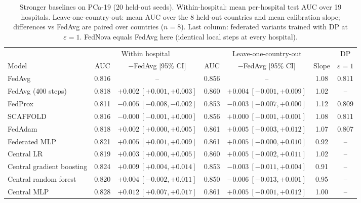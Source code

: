 \begin{table}[t]
\caption{Stronger baselines on PCa-19 (20 held-out seeds). Within-hospital: mean per-hospital test AUC over 19 hospitals. Leave-one-country-out: mean AUC over the 8 held-out countries and mean calibration slope; differences vs FedAvg are paired over countries ($n=8$). Last column: federated variants trained with DP at $\varepsilon=1$. FedNova equals FedAvg here (identical local steps at every hospital).}
\centering\small
\begin{tabular}{lcccccc}
\toprule
& \multicolumn{2}{c}{Within hospital} & \multicolumn{3}{c}{Leave-one-country-out} & DP \\
Model & AUC & $-$FedAvg [95\% CI] & AUC & $-$FedAvg [95\% CI] & Slope & $\varepsilon=1$ \\
\midrule
FedAvg & 0.816 & -- & 0.856 & -- & 1.08 & 0.811 \\
FedAvg (400 steps) & 0.818 & $+0.002\ [+0.001, +0.003]$ & 0.860 & $+0.004\ [\ensuremath{-}0.001, +0.009]$ & 1.02 & -- \\
FedProx & 0.811 & $-0.005\ [\ensuremath{-}0.008, \ensuremath{-}0.002]$ & 0.853 & $-0.003\ [\ensuremath{-}0.007, +0.000]$ & 1.12 & 0.809 \\
SCAFFOLD & 0.816 & $-0.000\ [\ensuremath{-}0.001, +0.000]$ & 0.856 & $+0.000\ [\ensuremath{-}0.001, +0.001]$ & 1.08 & 0.811 \\
FedAdam & 0.818 & $+0.002\ [+0.000, +0.005]$ & 0.861 & $+0.005\ [\ensuremath{-}0.003, +0.012]$ & 1.07 & 0.807 \\
Federated MLP & 0.821 & $+0.005\ [+0.001, +0.009]$ & 0.861 & $+0.005\ [\ensuremath{-}0.000, +0.010]$ & 0.92 & -- \\
\midrule
Central LR & 0.819 & $+0.003\ [+0.000, +0.005]$ & 0.860 & $+0.005\ [\ensuremath{-}0.002, +0.011]$ & 1.02 & -- \\
Central gradient boosting & 0.824 & $+0.009\ [+0.004, +0.014]$ & 0.853 & $-0.003\ [\ensuremath{-}0.011, +0.004]$ & 0.91 & -- \\
Central random forest & 0.820 & $+0.004\ [\ensuremath{-}0.002, +0.011]$ & 0.850 & $-0.006\ [\ensuremath{-}0.013, +0.001]$ & 0.95 & -- \\
Central MLP & 0.828 & $+0.012\ [+0.007, +0.017]$ & 0.861 & $+0.005\ [\ensuremath{-}0.001, +0.012]$ & 1.00 & -- \\
\bottomrule
\end{tabular}
\label{tab:baselines}
\end{table}

